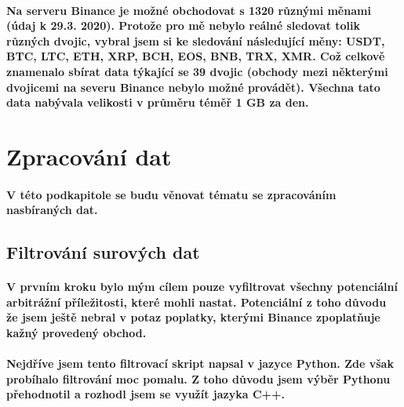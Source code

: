 \documentclass[thesis=B,czech]{FITthesis}[2019/03/21]
\begin{document}
\paragraph{
Na serveru Binance je možné obchodovat s 1320 různými měnami (údaj k 29.3. 2020). Protože pro mě nebylo reálné sledovat tolik různých dvojic, vybral jsem si ke sledování následující měny: USDT, BTC, LTC, ETH, XRP, BCH, EOS, BNB, TRX, XMR. Což celkově znamenalo sbírat data týkající se 39 dvojic (obchody mezi některými dvojicemi na severu Binance nebylo možné provádět). Všechna tato data nabývala velikosti v průměru téměř 1 GB za den.
}
\section{Zpracování dat}
\paragraph{
V této podkapitole se budu věnovat tématu se zpracováním nasbíraných dat.
}
\subsection{Filtrování surových dat}
\paragraph{
V prvním kroku bylo mým cílem pouze vyfiltrovat všechny potenciální arbitrážní příležitosti, které mohli nastat. Potenciální z toho důvodu že jsem ještě nebral v potaz poplatky, kterými Binance zpoplatňuje kažný provedený obchod.
}
\paragraph{
Nejdříve jsem tento filtrovací skript napsal v jazyce Python. Zde však probíhalo filtrování moc pomalu. Z toho důvodu jsem výběr Pythonu přehodnotil a rozhodl jsem se využít jazyka C++. 
}
\end{document}
